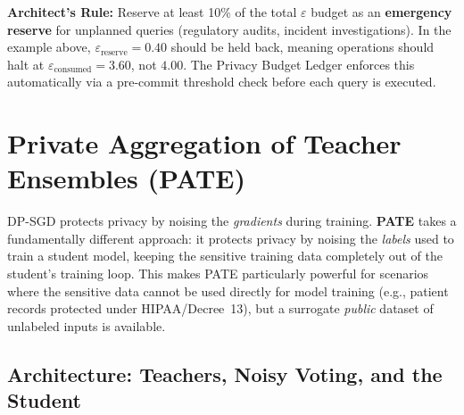 \begin{svgraybox}
\textbf{Architect's Rule:} Reserve at least 10\% of the total $\varepsilon$ budget as an \textbf{emergency reserve} for unplanned queries (regulatory audits, incident investigations). In the example above, $\varepsilon_{\mathrm{reserve}} = 0.40$ should be held back, meaning operations should halt at $\varepsilon_{\mathrm{consumed}} = 3.60$, not $4.00$. The Privacy Budget Ledger enforces this automatically via a pre-commit threshold check before each query is executed.
\end{svgraybox}

\section{Private Aggregation of Teacher Ensembles (PATE)}
\label{sec:pate}

DP-SGD protects privacy by noising the \emph{gradients} during training. \textbf{PATE} \cite{papernot2017} takes a fundamentally different approach: it protects privacy by noising the \emph{labels} used to train a student model, keeping the sensitive training data completely out of the student's training loop. This makes PATE particularly powerful for scenarios where the sensitive data cannot be used directly for model training (e.g., patient records protected under HIPAA/Decree~13), but a surrogate \emph{public} dataset of unlabeled inputs is available.

\subsection{Architecture: Teachers, Noisy Voting, and the Student}
\label{subsec:pate_architecture}

